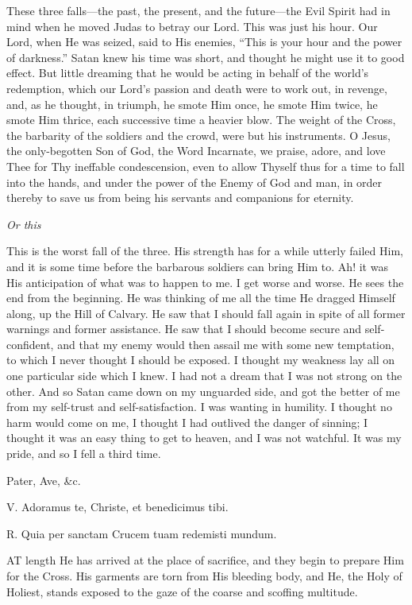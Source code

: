 These three falls—the past,
the present, and the future—the Evil Spirit had in mind when he moved
Judas to betray our Lord. This was just his hour. Our Lord, when He was
seized, said to His enemies, ``This is your hour and the power of
darkness.'' Satan knew his time was short, and thought he might use it to
good effect. But little dreaming that he would be acting in behalf of
the world's redemption, which our Lord's passion and death were to work
out, in revenge, and, as he thought, in triumph, he smote Him once, he
smote Him twice, he smote Him thrice, each successive time a heavier
blow. The weight of the Cross, the barbarity of the soldiers and the
crowd, were but his instruments. O Jesus, the only-begotten Son of God,
the Word Incarnate, we praise, adore, and love Thee for Thy ineffable
condescension, even to allow Thyself thus for a time to fall into the
hands, and under the power of the Enemy of God and man, in order thereby
to save us from being his servants and companions for eternity.

\emph{Or
this}

This is the worst fall of the
three. His strength has for a while utterly failed Him, and it is some
time before the barbarous soldiers can bring Him to. Ah! it was His
anticipation of what was to happen to me. I get worse and worse. He sees
the end from the beginning. He was thinking of me all the time He
dragged Himself along, up the Hill of Calvary. He saw that I should fall
again in spite of all former warnings and former assistance. He saw that
I should become secure and self-confident, and that my enemy would
then assail me with some new temptation, to which I never thought I
should be exposed. I thought my weakness lay all on one particular side
which I knew. I had not a dream that I was not strong on the other. And
so Satan came down on my unguarded side, and got the better of me from
my self-trust and self-satisfaction. I was wanting in humility. I
thought no harm would come on me, I thought I had outlived the danger of
sinning; I thought it was an easy thing to get to heaven, and I was not
watchful. It was my pride, and so I fell a third time.

Pater, Ave, \&c.


V. Adoramus te, Christe, et
benedicimus tibi.

R. Quia per sanctam Crucem tuam redemisti mundum.

AT length He has
arrived at the place of sacrifice, and they begin to prepare Him for the
Cross. His garments are torn from His bleeding body, and He, the Holy of
Holiest, stands exposed to the gaze of the coarse and scoffing
multitude.

